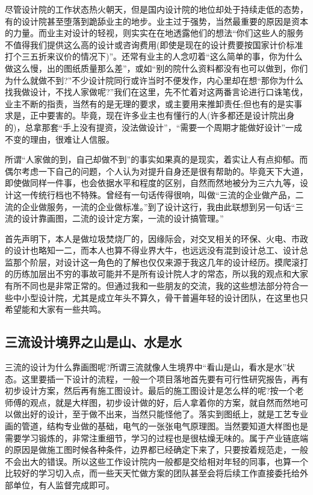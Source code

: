 \documentclass[]{book}
\begin{document}
尽管设计院的工作状态热火朝天，但是国内设计院的地位却处于持续走低的态势，有的设计院甚至堕落到跪舔业主的地步。业主过于强势，当然最重要的原因是资本的力量。而业主对设计的轻视，则实实在在地透露他们的想法``你们这些人的服务不值得我们提供这么高的设计或咨询费用(即使是现在的设计费要按国家计价标准打个三五折来议价的情况下)''。还常有业主的人念叨着``这么简单的事，你为什么做这么慢，出的图纸质量那么差''，或如``别的院什么资料都没有也可以做到，你们为什么就做不到?''不少设计院同行或许当时不便发作，内心里却在想``那你为什么找我做设计，不找人家做呢?''我们在这里，先不忙着对这两番言论进行口诛笔伐，业主不断的指责，当然有的是无理的要求，或主要用来推卸责任;但也有的是实事求是，正中要害的。毕竟，现在许多业主也有懂行的人(许多都还是设计院出身的)，总拿那套``手上没有提资，没法做设计''，``需要一个周期才能做好设计''一成不变的理由，很难让人信服。

所谓``人家做的到，自己却做不到''的事实如果真的是现实，着实让人有点抑郁。而偶尔考虑一下自己的问题，个人认为对提升自身还是很有帮助的。毕竟天下大道，即使做同样一件事，也会依据水平和程度的区别，自然而然地被分为三六九等，设计这一传统行档也不特殊。曾经有一句话传得很响，叫做``三流的企业做产品，二流的企业做服务，一流的企业做标准。''到了设计这行，我由此联想到另一句话``三流的设计靠画图，二流的设计定方案，一流的设计搞管理。''

首先声明下，本人是做垃圾焚烧厂的，因缘际会，对交叉相关的环保、火电、市政的设计也略知一二，而本人也算不得业界大牛，也远远没有混到设计总工、设计总监那个阶层，对设计这一角色的了解也仅仅来源于我这几年的设计经历。摸爬滚打的历练加层出不穷的事故可能并不是所有设计院人才的常态，所以我的观点和大家有所不同也是非常正常的。但通过我和一些朋友的交流，我的这些想法部分符合一些中小型设计院，尤其是成立年头不算久，骨干普遍年轻的设计团队，在这里也只希望能和大家有一些共鸣。

\hypertarget{ux4e09ux6d41ux8bbeux8ba1ux5883ux754cux4e4bux5c71ux662fux5c71ux6c34ux662fux6c34}{%
\subsection{三流设计境界之山是山、水是水}\label{ux4e09ux6d41ux8bbeux8ba1ux5883ux754cux4e4bux5c71ux662fux5c71ux6c34ux662fux6c34}}

三流的设计为什么靠画图呢?所谓三流就像人生境界中``看山是山，看水是水''状态。这里要插一下设计的流程，一般一个项目落地首先要有可行性研究报告，再有初步设计方案，然后再有施工图设计。最后的施工图设计是怎么样的呢?按一个老师傅的观点，就是大样图，初步设计做的好，后人拿着你的方案，就自然而然地可以做出好的设计，至于做不出来，当然只能怪他了。落实到图纸上，就是工艺专业画的管道，结构专业做的基础，电气的一张张电气原理图。当然要知道大样图也是需要学习锻炼的，非常注重细节，学习的过程也是很枯燥无味的。属于产业链底端的原因是做施工图时候各种条件，边界都已经确定下来了，只要按着规范走，一般不会出大的错误。所以这些工作设计院内一般都是交给相对年轻的同事，也算一个比较好的学习切入点，而一些天天忙做方案的团队甚至会将后续工作直接委托给外部单位，有人监督完成即可。
\end{document}
